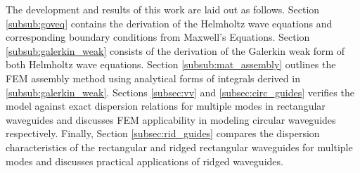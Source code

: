The development and results of this work are laid out as follows. Section \ref{subsub:goveq} contains the derivation of the Helmholtz wave equations and corresponding boundary conditions from Maxwell's Equations. Section \ref{subsub:galerkin_weak} consists of the derivation of the Galerkin weak form of both Helmholtz wave equations. Section \ref{subsub:mat_assembly} outlines the FEM assembly method using analytical forms of integrals derived in \ref{subsub:galerkin_weak}. Sections \ref{subsec:vv} and \ref{subsec:circ_guides} verifies the model against exact dispersion relations for multiple modes in rectangular waveguides and discusses FEM applicability in modeling circular waveguides respectively. Finally, Section \ref{subsec:rid_guides} compares the dispersion characteristics of the rectangular and ridged rectangular waveguides for multiple modes and discusses practical applications of ridged waveguides.